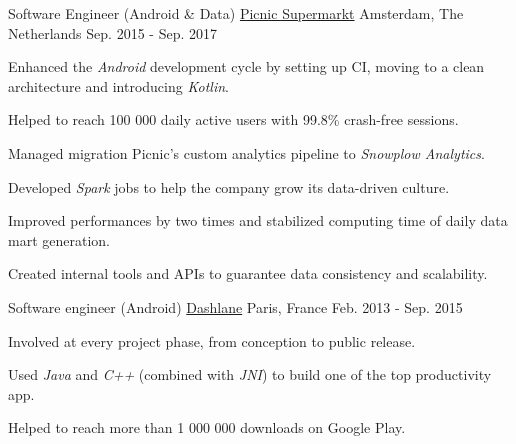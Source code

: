 
	\begin{cventries}
	
		\cventry
			{Software Engineer (Android \& Data)}
			{\href{https://www.picnic.nl}{Picnic Supermarkt}}
			{Amsterdam, The Netherlands}
			{Sep. 2015 - Sep. 2017}
			{
				\begin{cvitems}
					\item Enhanced the \textit{Android} development cycle by setting up CI, moving to a clean architecture and introducing \textit{Kotlin}.
					\item Helped to reach 100 000 daily active users with 99.8\% crash-free sessions.
					\item Managed migration Picnic's custom analytics pipeline to \textit{Snowplow Analytics}.
					\item Developed \textit{Spark} jobs to help the company grow its data-driven culture.
					\item Improved performances by two times and stabilized computing time of daily data mart generation.
					\item Created internal tools and APIs to guarantee data consistency and scalability.
				\end{cvitems}
			}
		
		\cventry
			{Software engineer (Android)}
			{\href{https://www.dashlane.com}{Dashlane}}
			{Paris, France}
			{Feb. 2013 - Sep. 2015}
			{
				\begin{cvitems}
					\item Involved at every project phase, from conception to public release.
					\item Used \textit{Java} and \textit{C++} (combined with \textit{JNI}) to build one of the top productivity app.
					\item Helped to reach more than 1 000 000 downloads on Google Play.
				\end{cvitems}
			}
		

\end{cventries}
